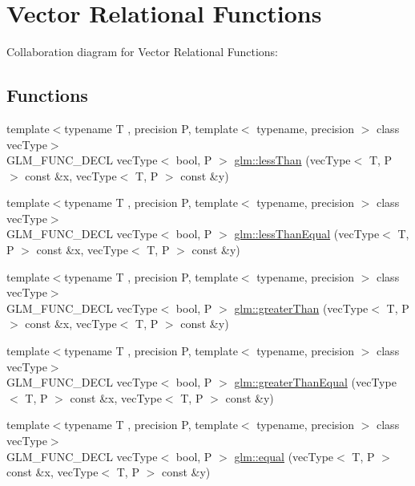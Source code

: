 \hypertarget{group__core__func__vector__relational}{\section{Vector Relational Functions}
\label{group__core__func__vector__relational}
}
Collaboration diagram for Vector Relational Functions\-:
\subsection*{Functions}
\begin{DoxyCompactItemize}
\item 
{\footnotesize template$<$typename T , precision P, template$<$ typename, precision $>$ class vec\-Type$>$ }\\G\-L\-M\-\_\-\-F\-U\-N\-C\-\_\-\-D\-E\-C\-L vec\-Type$<$ bool, P $>$ \hyperlink{group__core__func__vector__relational_ga6261970937a70b0b747ae0d3ade1c188}{glm\-::less\-Than} (vec\-Type$<$ T, P $>$ const \&x, vec\-Type$<$ T, P $>$ const \&y)
\item 
{\footnotesize template$<$typename T , precision P, template$<$ typename, precision $>$ class vec\-Type$>$ }\\G\-L\-M\-\_\-\-F\-U\-N\-C\-\_\-\-D\-E\-C\-L vec\-Type$<$ bool, P $>$ \hyperlink{group__core__func__vector__relational_gaaf1d88119f11200c32011de7c5ec0102}{glm\-::less\-Than\-Equal} (vec\-Type$<$ T, P $>$ const \&x, vec\-Type$<$ T, P $>$ const \&y)
\item 
{\footnotesize template$<$typename T , precision P, template$<$ typename, precision $>$ class vec\-Type$>$ }\\G\-L\-M\-\_\-\-F\-U\-N\-C\-\_\-\-D\-E\-C\-L vec\-Type$<$ bool, P $>$ \hyperlink{group__core__func__vector__relational_gadd80263161a308462d3e3e287e79cccd}{glm\-::greater\-Than} (vec\-Type$<$ T, P $>$ const \&x, vec\-Type$<$ T, P $>$ const \&y)
\item 
{\footnotesize template$<$typename T , precision P, template$<$ typename, precision $>$ class vec\-Type$>$ }\\G\-L\-M\-\_\-\-F\-U\-N\-C\-\_\-\-D\-E\-C\-L vec\-Type$<$ bool, P $>$ \hyperlink{group__core__func__vector__relational_gaee7e101f8cc4ea43924f14dcdeb2ef26}{glm\-::greater\-Than\-Equal} (vec\-Type$<$ T, P $>$ const \&x, vec\-Type$<$ T, P $>$ const \&y)
\item 
{\footnotesize template$<$typename T , precision P, template$<$ typename, precision $>$ class vec\-Type$>$ }\\G\-L\-M\-\_\-\-F\-U\-N\-C\-\_\-\-D\-E\-C\-L vec\-Type$<$ bool, P $>$ \hyperlink{group__core__func__vector__relational_ga39c80d8baf49b0ce69f2bb22d45b3801}{glm\-::equal} (vec\-Type$<$ T, P $>$ const \&x, vec\-Type$<$ T, P $>$ const \&y)

\end{DoxyCompactItemize}
